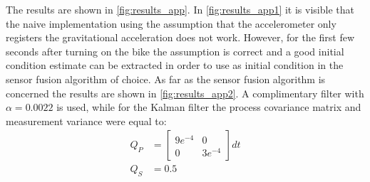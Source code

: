 The results are shown in \cref{fig:results_app}. In \cref{fig:results_app1} it is visible that the naive implementation using the assumption that the accelerometer only registers the gravitational acceleration does not work. However, for the first few seconds after turning on the bike the assumption is correct and a good initial condition estimate can be extracted  in order to use as initial condition in the sensor fusion algorithm of choice. As far as the sensor fusion algorithm is concerned the results are shown in \cref{fig:results_app2}. A complimentary filter with \ensuremath{\alpha = 0.0022} is used, while for the Kalman filter the process covariance matrix and measurement variance were equal to:
\begin{align}
Q_P &=\left[\begin{array}{cc}{9 e^{-4}} & {0} \\ {0} & {3 e^{-4}}\end{array}\right]dt 
\\ 
Q_S &=0.5
\end{align}


